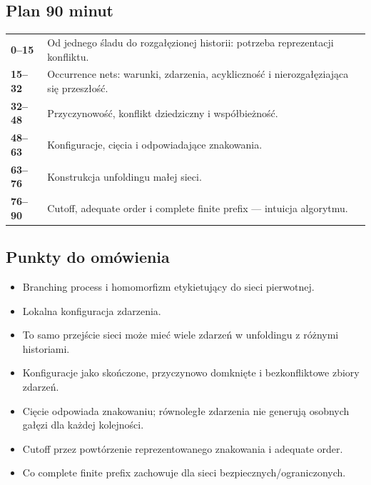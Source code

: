 \documentclass[11pt,a4paper]{article}
\begin{document}
\subsection{Plan 90 minut}
\begin{center}\small\begin{tabularx}{0.96\textwidth}{@{}>{\bfseries}p{18mm}X@{}}
0--15 & Od jednego śladu do rozgałęzionej historii: potrzeba reprezentacji konfliktu.\\
15--32 & Occurrence nets: warunki, zdarzenia, acykliczność i nierozgałęziająca się przeszłość.\\
32--48 & Przyczynowość, konflikt dziedziczny i współbieżność.\\
48--63 & Konfiguracje, cięcia i odpowiadające znakowania.\\
63--76 & Konstrukcja unfoldingu małej sieci.\\
76--90 & Cutoff, adequate order i complete finite prefix --- intuicja algorytmu.\\
\end{tabularx}\end{center}

\subsection{Punkty do omówienia}
\begin{itemize}
\item Branching process i homomorfizm etykietujący do sieci pierwotnej.
\item Lokalna konfiguracja zdarzenia.
\item To samo przejście sieci może mieć wiele zdarzeń w unfoldingu z różnymi historiami.
\item Konfiguracje jako skończone, przyczynowo domknięte i bezkonfliktowe zbiory zdarzeń.
\item Cięcie odpowiada znakowaniu; równoległe zdarzenia nie generują osobnych gałęzi dla każdej kolejności.
\item Cutoff przez powtórzenie reprezentowanego znakowania i adequate order.
\item Co complete finite prefix zachowuje dla sieci bezpiecznych/ograniczonych.
\end{itemize}
\end{document}
